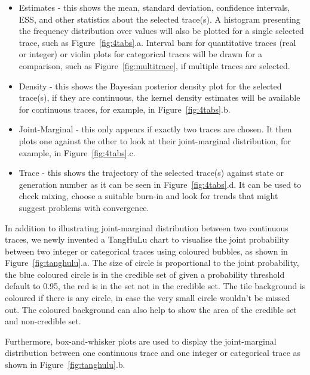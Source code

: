 \documentclass{bioinfo}
\begin{document}
\begin{itemize}
\item Estimates - this shows the mean, standard deviation, confidence intervals, ESS, and other statistics about the selected trace(s). A histogram presenting the frequency distribution over values will also be plotted for a single selected trace, such as Figure~\ref{fig:4tabs}.a. Interval bars for quantitative traces (real or integer) or violin plots for categorical traces will be drawn for a comparison, such as Figure~\ref{fig:multitrace}, if multiple traces are selected.

\item Density - this shows the Bayesian posterior density plot for the selected trace(s), if they are continuous, the kernel density estimates will be available for continuous traces, for example, in Figure~\ref{fig:4tabs}.b.

\item Joint-Marginal - this only appears if exactly two traces are chosen. It then plots one against the other to look at their joint-marginal distribution, for example, in Figure~\ref{fig:4tabs}.c.

\item Trace - this shows the trajectory of the selected trace(s) against state or generation number as it can be seen in Figure~\ref{fig:4tabs}.d. It can be used to check mixing, choose a suitable burn-in and look for trends that might suggest problems with convergence.

\end{itemize}

In addition to illustrating joint-marginal distribution between two continuous traces, we newly invented a TangHuLu chart to visualise the joint probability between two integer or categorical traces using coloured bubbles, as shown in Figure~\ref{fig:tanghulu}.a. The size of circle is proportional to the joint probability, the blue coloured circle is in the credible set of given a probability threshold default to 0.95, the red is in the set not in the credible set. The tile background is coloured if there is any circle, in case the very small circle wouldn't be missed out. The coloured background can also help to show the area of the credible set and non-credible set.

Furthermore, box-and-whisker plots are used to display the joint-marginal distribution between one continuous trace and one integer or categorical trace as shown in Figure~\ref{fig:tanghulu}.b. 
\end{document}

